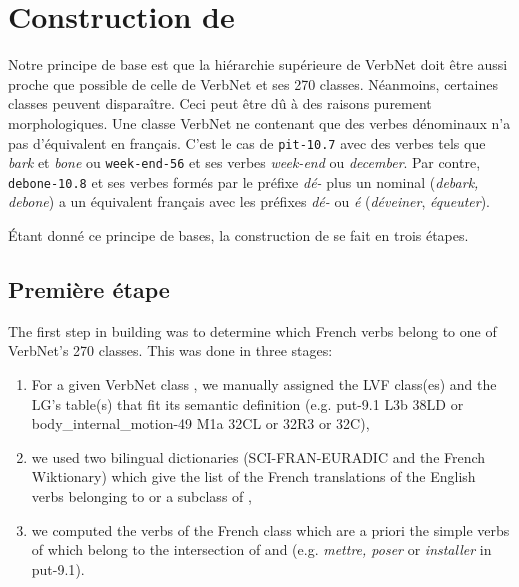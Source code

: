 \section{Construction de \verbenet{}}

Notre principe de base est que la hiérarchie supérieure de VerbNet doit être
aussi proche que possible de celle de VerbNet et ses 270 classes. Néanmoins,
certaines classes peuvent disparaître. Ceci peut être dû à des raisons purement
morphologiques. Une classe VerbNet ne contenant que des verbes dénominaux n'a
pas d'équivalent en français. C'est le cas de \texttt{pit-10.7} avec des verbes
tels que \emph{bark} et \emph{bone} ou \texttt{week-end-56} et ses verbes
\emph{week-end} ou \emph{december}. Par contre, \texttt{debone-10.8} et ses
verbes formés par le préfixe \emph{dé-} plus un nominal (\emph{debark, debone})
a un équivalent français avec les préfixes \emph{dé-} ou \emph{é}
(\emph{déveiner}, \emph{équeuter}).

Étant donné ce principe de bases, la construction de \verbenet{} se fait en
trois étapes.

\subsection{Première étape}\label{first}

The first step in building \verbenet{} was to determine which French verbs
belong to one of  VerbNet's 270 classes. This was done in three stages:

\begin{enumerate}

    \item For a given VerbNet class \Ce{}, we  manually assigned the LVF class(es)
    \Clvf{} and the LG's table(s) \Clg{} that fit its semantic definition (e.g.
    {\color{blue}put-9.1} {\color{red}L3b} {\color{green}38LD} or
    {\color{blue}body\_internal\_motion-49} {\color{red}M1a} {\color{green}32CL or
    32R3 or 32C}),

    \item we used two bilingual dictionaries (SCI-FRAN-EURADIC and the French
    Wiktionary) which give the list \Ltrad{} of the French translations of the
    English verbs belonging to \Ce{} or a subclass of \Ce{},

    \item we computed the verbs of the French class \Cf{} which are a priori the
    simple verbs of \Ltrad{} which belong to the intersection of \Clvf{} and \Clg{}
    (e.g. \emph{mettre, poser} or \emph{installer} in {\color{blue}put-9.1}).

\end{enumerate}

